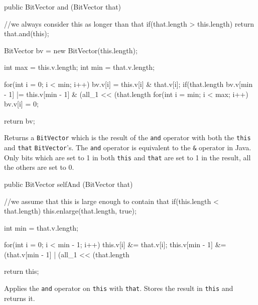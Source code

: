 \begin{code}

   public BitVector and (BitVector that) \begin{hide} {
      //we always consider this as longer than that
      if(that.length > this.length)
         return that.and(this);

      BitVector bv = new BitVector(this.length);

      int max = this.v.length;
      int min = that.v.length;

      for(int i = 0; i < min; i++)
         bv.v[i] = this.v[i] & that.v[i];
      if(that.length %
         bv.v[min - 1] |= this.v[min - 1] & (all_1 << (that.length %
      for(int i = min; i < max; i++)
         bv.v[i] = 0;

      return bv;
   } \end{hide}
\end{code}
\begin{tabb} Returns a \texttt{BitVector} which is the result of the \texttt{and}
  operator with both the \texttt{this} and \texttt{that} \texttt{BitVector}'s. The
  \texttt{and} operator is equivalent to the \verb!&! operator in Java. Only
  bits which are set to 1 in both \texttt{this} and \texttt{that} are set to 1
  in the result, all the others are set to 0.
\end{tabb}
\begin{htmlonly}
\end{htmlonly}
\begin{code}

   public BitVector selfAnd (BitVector that) \begin{hide} {
      //we assume that this is large enough to contain that
      if(this.length < that.length)
         this.enlarge(that.length, true);

      int min = that.v.length;

      for(int i = 0; i < min - 1; i++)
         this.v[i] &= that.v[i];
      this.v[min - 1] &= (that.v[min - 1] | (all_1 << (that.length %

      return this;
   } \end{hide}
\end{code}
\begin{tabb} Applies the \texttt{and} operator on \texttt{this} with \texttt{that}.
  Stores the result  in \texttt{this} and returns it.
\end{tabb}
